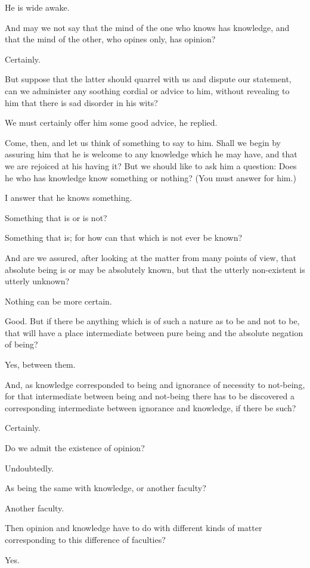 He is wide awake.

And may we not say that the mind of the one who knows has knowledge, and
that the mind of the other, who opines only, has opinion?

Certainly.

But suppose that the latter should quarrel with us and dispute our
statement, can we administer any soothing cordial or advice to him,
without revealing to him that there is sad disorder in his wits?

We must certainly offer him some good advice, he replied.

Come, then, and let us think of something to say to him. Shall we begin
by assuring him that he is welcome to any knowledge which he may have,
and that we are rejoiced at his having it? But we should like to ask him
a question: Does he who has knowledge know something or nothing? (You
must answer for him.)

I answer that he knows something.

Something that is or is not?

Something that is; for how can that which is not ever be known?

And are we assured, after looking at the matter from many points of
view, that absolute being is or may be absolutely known, but that the
utterly non-existent is utterly unknown?

Nothing can be more certain.

Good. But if there be anything which is of such a nature as to be and
not to be, that will have a place intermediate between pure being and
the absolute negation of being?

Yes, between them.

And, as knowledge corresponded to being and ignorance of necessity to
not-being, for that intermediate between being and not-being there has
to be discovered a corresponding intermediate between ignorance and
knowledge, if there be such?

Certainly.

Do we admit the existence of opinion?

Undoubtedly.

As being the same with knowledge, or another faculty?

Another faculty.

Then opinion and knowledge have to do with different kinds of matter
corresponding to this difference of faculties?

Yes.

